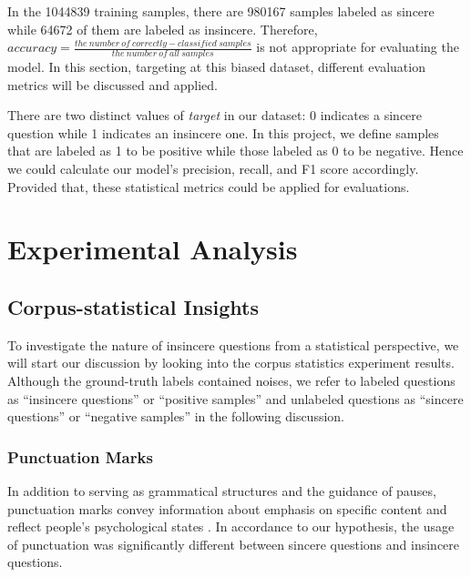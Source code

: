 \documentclass[12pt]{diazessay} %
\begin{document}
In the \num[group-separator={,}]{1044839} training samples, there are \num[group-separator={,}]{980167} samples labeled as sincere while \num[group-separator={,}]{64672} of them are labeled as insincere. Therefore, $accuracy = \frac{ the\ number\ of\ correctly-classified\ samples}{the\ number\ of\ all\ samples}$ is not appropriate for evaluating the model. In this section, targeting at this biased dataset, different evaluation metrics will be discussed and applied.

There are two distinct values of \textit{target} in our dataset: 0 indicates a sincere question while 1 indicates an insincere one. In this project, we define samples that are labeled as 1 to be positive while those labeled as 0 to be negative. Hence we could calculate our model's precision, recall, and F1 score accordingly. Provided that, these statistical metrics could be applied for evaluations.

\section{Experimental Analysis} %
\label{sec:experimental_analysis}

\subsection{Corpus-statistical Insights} %
\label{ssub:corpus_statistical_insights}

To investigate the nature of insincere questions from a statistical perspective, we will start our discussion by looking into the corpus statistics experiment results. Although the ground-truth labels contained noises, we refer to labeled questions as ``insincere questions'' or ``positive samples'' and unlabeled questions as ``sincere questions'' or ``negative samples'' in the following discussion. 

\subsubsection{Punctuation Marks} %
\label{ssub:punctuation_marks}

In addition to serving as grammatical structures and the guidance of pauses, punctuation marks convey information about emphasis on specific content and reflect people's psychological states \citep{thorndike1948punc}. In accordance to our hypothesis, the usage of punctuation was significantly different between sincere questions and insincere questions. 
\end{document}
